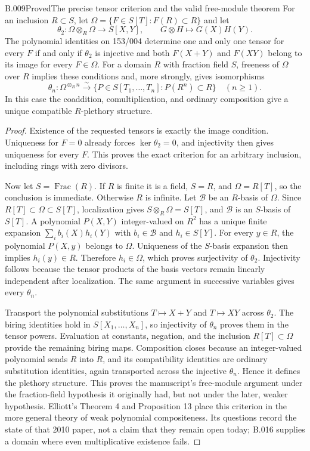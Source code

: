 \begin{saresult}{B.009}{Proved}{The precise tensor criterion and the valid free-module theorem}
For an inclusion $R\subset S$, let
$\Omega=\{F\in S[T]:F(R)\subset R\}$ and let
\[
 \theta_2:\Omega\otimes_R\Omega\longrightarrow S[X,Y],
 \qquad G\otimes H\longmapsto G(X)H(Y).
\]
The polynomial identities on 153/004 determine one and only one
tensor for every $F$ if and only if $\theta_2$ is injective and both
$F(X+Y)$ and $F(XY)$ belong to its image for every $F\in\Omega$.
For a domain $R$ with fraction field $S$, freeness of $\Omega$ over
$R$ implies these conditions and, more strongly, gives isomorphisms
\[
 \theta_n:\Omega^{\otimes_R n}\xrightarrow{\sim}
 \{P\in S[T_1,\ldots,T_n]:P(R^n)\subset R\}
 \quad(n\ge1).
\]
In this case the coaddition, comultiplication, and ordinary
composition give a unique compatible $R$-plethory structure.
\end{saresult}
\begin{proof}
Existence of the requested tensors is exactly the image condition.
Uniqueness for $F=0$ already forces $\ker\theta_2=0$, and injectivity
then gives uniqueness for every $F$. This proves the exact criterion
for an arbitrary inclusion, including rings with zero divisors.

Now let $S=\operatorname{Frac}(R)$. If $R$ is finite it is a field,
$S=R$, and $\Omega=R[T]$, so the conclusion is immediate. Otherwise
$R$ is infinite. Let $\mathcal B$ be an $R$-basis of $\Omega$.
Since $R[T]\subset\Omega\subset S[T]$, localization gives
$S\otimes_R\Omega=S[T]$, and $\mathcal B$ is an $S$-basis of
$S[T]$. A polynomial $P(X,Y)$ integer-valued on $R^2$ has a unique
finite expansion $\sum_i b_i(X)h_i(Y)$ with $b_i\in\mathcal B$ and
$h_i\in S[Y]$. For every $y\in R$, the polynomial $P(X,y)$ belongs
to $\Omega$. Uniqueness of the $S$-basis expansion then implies
$h_i(y)\in R$. Therefore $h_i\in\Omega$, which proves surjectivity
of $\theta_2$. Injectivity follows because the tensor products of
the basis vectors remain linearly independent after localization.
The same argument in successive variables gives every $\theta_n$.

Transport the polynomial substitutions $T\mapsto X+Y$ and
$T\mapsto XY$ across $\theta_2$. The biring identities hold in
$S[X_1,\ldots,X_n]$, so injectivity of $\theta_n$ proves them in
the tensor powers. Evaluation at constants, negation, and the
inclusion $R[T]\subset\Omega$ provide the remaining biring maps.
Composition closes because an integer-valued polynomial sends
$R$ into $R$, and its compatibility identities are ordinary
substitution identities, again transported across the injective
$\theta_n$. Hence it defines the plethory structure. This proves
the manuscript's free-module argument under the fraction-field
hypothesis it originally had, but not under the later, weaker
hypothesis. Elliott's Theorem 4 and Proposition 13
\cite{Elliott2010} place this criterion in the more general
theory of weak polynomial compositeness. Its questions record the
state of that 2010 paper, not a claim that they remain open today;
B.016 supplies a domain where even multiplicative existence fails.
\end{proof}

